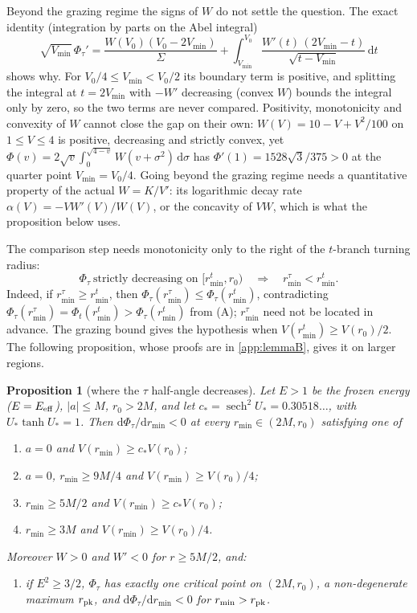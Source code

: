 \documentclass[12pt]{iopart}
\theoremstyle{plain}
\newtheorem{proposition}{Proposition}
\theoremstyle{definition}
\theoremstyle{remark}
\newcommand{\dd}{\mathrm{d}}
\begin{document}
Beyond the grazing regime the signs of $W$ do not settle the question. The exact identity
(integration by parts on the Abel integral)
\begin{equation}
    \sqrt{V_{\min}}\,\Phi_\tau'=\frac{W(V_0)(V_0-2V_{\min})}{\Sigma}
    +\int_{V_{\min}}^{V_0}\!\frac{W'(t)\,(2V_{\min}-t)}{\sqrt{t-V_{\min}}}\,\dd t
    \label{eq:phitau-closed}
\end{equation}
shows why. For $V_0/4\le V_{\min}<V_0/2$ its boundary term is positive, and splitting the
integral at $t=2V_{\min}$ with $-W'$ decreasing (convex $W$) bounds the integral only by
zero, so the two terms are never compared. Positivity, monotonicity and convexity of $W$
cannot close the gap on their own: $W(V)=10-V+V^2/100$ on $1\le V\le4$ is positive,
decreasing and strictly convex, yet
$\Phi(v)=2\sqrt v\int_0^{\sqrt{4-v}}W(v+\sigma^2)\,\dd\sigma$ has
$\Phi'(1)=1528\sqrt3/375>0$ at the quarter point $V_{\min}=V_0/4$. Going beyond the grazing
regime needs a quantitative property of the actual $W=K/V'$: its logarithmic decay rate
$\alpha(V)=-VW'(V)/W(V)$, or the concavity of $VW$, which is what the proposition below
uses.

The comparison step needs monotonicity only to the right of the $t$-branch turning radius:
\begin{equation}
    \Phi_\tau\ \text{strictly decreasing on }[r_{\min}^t,r_0)\quad\Longrightarrow\quad
    r_{\min}^\tau<r_{\min}^t .
    \label{eq:grazing-noinv}
\end{equation}
Indeed, if $r_{\min}^\tau\ge r_{\min}^t$, then $\Phi_\tau(r_{\min}^\tau)\le\Phi_\tau(r_{\min}^t)$,
contradicting $\Phi_\tau(r_{\min}^\tau)=\Phi_t(r_{\min}^t)>\Phi_\tau(r_{\min}^t)$ from (A);
$r_{\min}^\tau$ need not be located in advance. The grazing bound gives the hypothesis when
$V(r_{\min}^t)\ge V(r_0)/2$. The following proposition, whose proofs are in
\ref{app:lemmaB}, gives it on larger regions.

\begin{proposition}[where the $\tau$ half-angle decreases]\label{prop:lemmaB}
Let $E>1$ be the frozen energy ($E=E_{\rm eff}$), $|a|\le M$, $r_0>2M$, and let
$c_\ast=\operatorname{sech}^2U_\ast=0.30518\ldots$, with $U_\ast\tanh U_\ast=1$. Then
$\dd\Phi_\tau/\dd r_{\min}<0$ at every $r_{\min}\in(2M,r_0)$ satisfying one of
\begin{enumerate}
\item[\rm(i)] $a=0$ and $V(r_{\min})\ge c_\ast V(r_0)$;
\item[\rm(ii)] $a=0$, $r_{\min}\ge9M/4$ and $V(r_{\min})\ge V(r_0)/4$;
\item[\rm(iii)] $r_{\min}\ge5M/2$ and $V(r_{\min})\ge c_\ast V(r_0)$;
\item[\rm(iv)] $r_{\min}\ge3M$ and $V(r_{\min})\ge V(r_0)/4$.
\end{enumerate}
Moreover $W>0$ and $W'<0$ for $r\ge5M/2$, and:
\begin{enumerate}
\item[\rm(v)] if $E^2\ge3/2$, $\Phi_\tau$ has exactly one critical point on $(2M,r_0)$, a
non-degenerate maximum $r_{\rm pk}$, and $\dd\Phi_\tau/\dd r_{\min}<0$ for
$r_{\min}>r_{\rm pk}$.
\end{enumerate}
\end{proposition}
\end{document}
